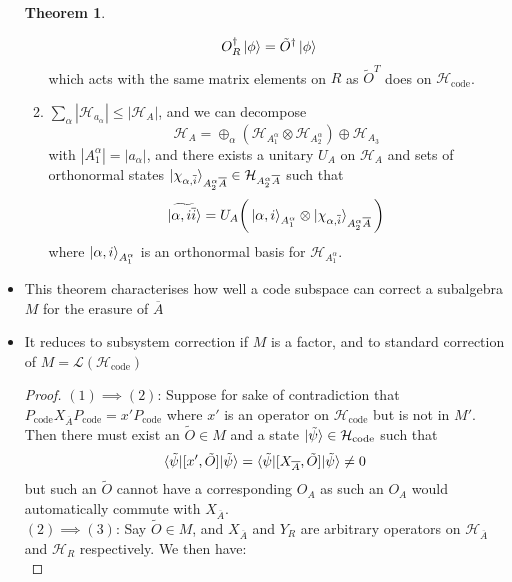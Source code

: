\documentclass[12pt,a4paper]{article}
\numberwithin{equation}{section}
\newcommand{\Pc}{P_{\text{code}}}
\newcommand{\Hcode}{\mathcal{H}_{\text{code}}}
\newcommand{\ol}[1]{\overline{#1}}
\theoremstyle{definition}
\theoremstyle{theorem}
\newtheorem{theorem}{Theorem}[section]
\theoremstyle{example}
\begin{document}
\begin{itemize}
\begin{theorem}
\begin{enumerate}
\begin{equation}
\begin{aligned}
						O_{R}^{\dagger}\ket{\phi}&=\tilde{O}^{\dagger}\ket{\phi}
					\end{aligned}
				\end{equation}
				which acts with the same matrix elements on $R$ as $\tilde{O}^{T}$ does on $\Hcode$.
				\item $\sum_{\alpha}|\mathcal{H}_{a_{\alpha}}|\leq|\mathcal{H}_{A}|$, and we can decompose 
				\begin{equation} 
					\mathcal{H}_{A}=\oplus_{\alpha}(\mathcal{H}_{A_{1}^{\alpha}}\otimes\mathcal{H}_{A_{2}^{\alpha}})\oplus\mathcal{H}_{A_{3}}
				\end{equation}
				with $|A_{1}^{\alpha}|=|a_{\alpha}|$, and there exists a unitary $U_{A}$ on $\mathcal{H}_{A}$ and sets of orthonormal states $\ket{\chi_{\alpha,\ol{i}}}_{A_{2}^{\alpha}\ol{A}}\in\mathcal{H}_{A_{2}^{\alpha}\ol{A}}$ such that
				\begin{equation}
					\ket{\widetilde{\alpha,i\ol{i}}}=U_{A}\bigg(\ket{\alpha,i}_{A_{1}^{\alpha}}\otimes\ket{\chi_{\alpha,\ol{i}}}_{A_{2}^{\alpha}\ol{A}}\bigg)
				\end{equation}
				where $\ket{\alpha,i}_{A_{1}^{\alpha}}$ is an orthonormal basis for $\mathcal{H}_{A_{1}^{\alpha}}$.
			\end{enumerate}
		\end{theorem}
		\item This theorem characterises how well a code subspace can correct a subalgebra $M$ for the erasure of $\ol{A}$
		\item It reduces to subsystem correction if $M$ is a factor, and to standard correction of $M=\mathcal{L}(\Hcode)$
		\begin{proof}
			$(1)\implies(2)$: Suppose for sake of contradiction that $\Pc X_{\ol{A}}\Pc=x'\Pc$ where $x'$ is an operator on $\Hcode$ but is not in $M'$. Then there must exist an $\tilde{O}\in M$ and a state $\ket{\tilde{\psi}}\in\Hcode$ such that
			\begin{equation}
				\braket{\tilde{\psi}|[x',\tilde{O}]|\tilde{\psi}}=\braket{\tilde{\psi}|[X_{\ol{A}},\tilde{O}]|\tilde{\psi}}\neq 0
			\end{equation}
			but such an $\tilde{O}$ cannot have a corresponding $O_{A}$ as such an $O_{A}$ would automatically commute with $X_{\ol{A}}$.\\
			$(2)\implies (3)$: Say $\tilde{O}\in M$, and $X_{\ol{A}}$ and $Y_{R}$ are arbitrary operators on $\mathcal{H}_{\ol{A}}$ and $\mathcal{H}_{R}$ respectively. We then have:
			\begin{equation}

\end{equation}
\end{proof}
\end{itemize}
\end{document}
